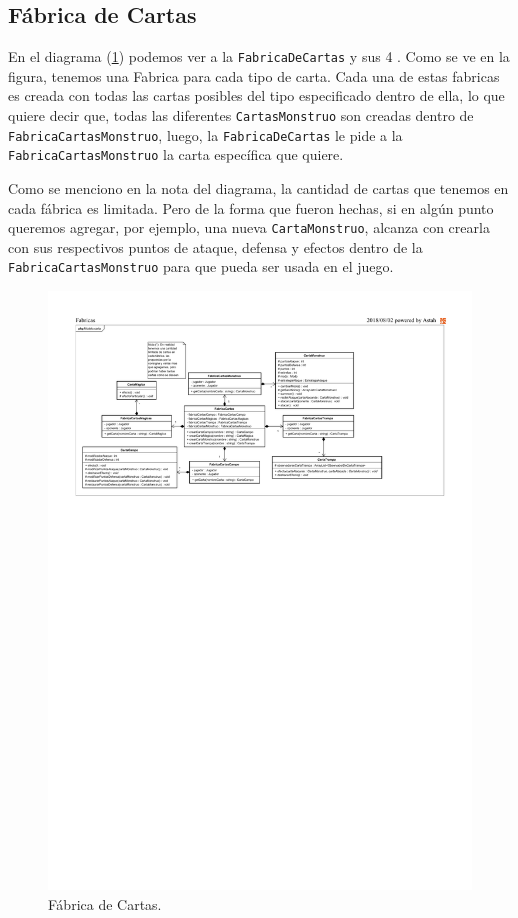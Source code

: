 	\subsection{Fábrica de Cartas}
	
	En el diagrama (\ref{class_FabricaCartas}) podemos ver a la \texttt{FabricaDeCartas} y sus 4 . Como se ve en la figura, tenemos una Fabrica para cada tipo de carta. Cada una de estas fabricas es creada con todas las cartas posibles del tipo especificado dentro de ella, lo que quiere decir que, todas las diferentes \texttt{CartasMonstruo} son creadas dentro de \texttt{FabricaCartasMonstruo}, luego, la \texttt{FabricaDeCartas} le pide a la \texttt{FabricaCartasMonstruo} la carta específica que quiere.
	
	Como se menciono en la nota del diagrama, la cantidad de cartas que tenemos en cada fábrica es limitada. Pero de la forma que fueron hechas, si en algún punto queremos agregar, por ejemplo, una nueva \texttt{CartaMonstruo}, alcanza con crearla con sus respectivos puntos de ataque, defensa y efectos dentro de la \texttt{FabricaCartasMonstruo} para que pueda ser usada en el juego.
	
	\begin{figure}[H]
		\centering
		\includegraphics[scale=0.8]{includes/class_FabricaCartas}
		\caption{Fábrica de Cartas.}
		\label{class_FabricaCartas}
	\end{figure}
	
